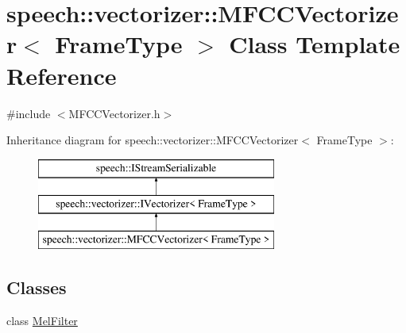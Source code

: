 \hypertarget{classspeech_1_1vectorizer_1_1MFCCVectorizer}{\section{speech\+:\+:vectorizer\+:\+:M\+F\+C\+C\+Vectorizer$<$ Frame\+Type $>$ Class Template Reference}
\label{classspeech_1_1vectorizer_1_1MFCCVectorizer}
}


{\ttfamily \#include $<$M\+F\+C\+C\+Vectorizer.\+h$>$}

Inheritance diagram for speech\+:\+:vectorizer\+:\+:M\+F\+C\+C\+Vectorizer$<$ Frame\+Type $>$\+:\begin{figure}[H]
\begin{center}
\leavevmode
\includegraphics[height=3.000000cm]{classspeech_1_1vectorizer_1_1MFCCVectorizer}
\end{center}
\end{figure}
\subsection*{Classes}
\begin{DoxyCompactItemize}
\item 
class \hyperlink{classspeech_1_1vectorizer_1_1MFCCVectorizer_1_1MelFilter}{Mel\+Filter}
\end{DoxyCompactItemize}
